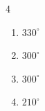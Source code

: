 \begin{multicols}{4}
\begin{enumerate}
  \item $\displaystyle 330^{\circ}$

  \item $\displaystyle 300^{\circ}$

  \item $\displaystyle 300^{\circ}$

  \item $\displaystyle 210^{\circ}$

\end{enumerate}
\end{multicols}

\newpage
\resetdrill


